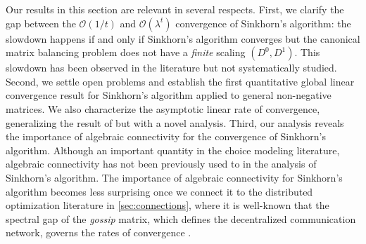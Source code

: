 Our results in this section are relevant in several respects. First, we clarify the gap between the $\mathcal O(1/t)$ and $\mathcal O(\lambda^t)$ convergence of Sinkhorn's algorithm: the slowdown happens if and only if Sinkhorn's algorithm converges but the canonical matrix balancing problem does not have a \emph{finite} scaling $(D^0,D^1)$. This slowdown has been observed in the literature but not systematically studied. Second, 
 we settle open problems and establish the first quantitative global linear convergence result for Sinkhorn's algorithm applied to general non-negative matrices. We also characterize the asymptotic linear rate of convergence, generalizing the result of \citet{knight2008sinkhorn} but with a novel analysis. 
  Third, our analysis reveals the importance of algebraic connectivity for the convergence of Sinkhorn's algorithm. Although an important quantity in the choice modeling literature, algebraic connectivity has not been previously used to in the analysis of Sinkhorn's algorithm. The importance of algebraic connectivity for Sinkhorn's algorithm becomes less surprising once we connect it to the distributed optimization literature in \cref{sec:connections}, where it is well-known that the spectral gap of the \emph{gossip} matrix, which defines the decentralized communication network, governs the rates of convergence \citep{boyd2006randomized}.
